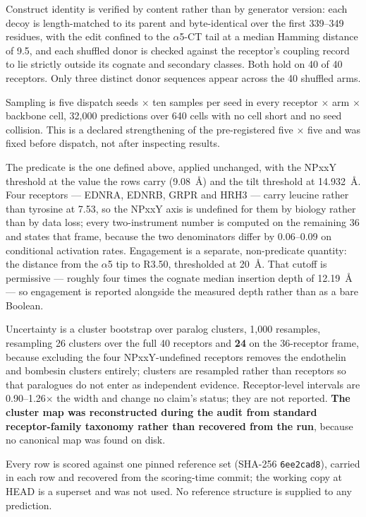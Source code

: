 Construct identity is verified by content rather than by generator version:
each decoy is length-matched to its parent and byte-identical over the first
339--349 residues, with the edit confined to the $\alpha$5-CT tail at a median
Hamming distance of 9.5, and each shuffled donor is checked against the
receptor's coupling record to lie strictly outside its cognate and secondary
classes. Both hold on 40 of 40 receptors. Only three distinct donor sequences
appear across the 40 shuffled arms.

Sampling is five dispatch seeds $\times$ ten samples per seed in every
receptor $\times$ arm $\times$ backbone cell, 32{,}000 predictions over 640
cells with no cell short and no seed collision. This is a declared
strengthening of the pre-registered five $\times$ five and was fixed before
dispatch, not after inspecting results.

The predicate is the one defined above, applied unchanged, with the NPxxY
threshold at the value the rows carry (9.08~\AA{}) and the tilt threshold at
14.932~\AA{}. Four receptors --- EDNRA, EDNRB, GRPR and HRH3 --- carry leucine
rather than tyrosine at 7.53, so the NPxxY axis is undefined for them by
biology rather than by data loss; every two-instrument number is computed on
the remaining 36 and states that frame, because the two denominators differ by
0.06--0.09 on conditional activation rates. Engagement is a separate,
non-predicate quantity: the distance from the $\alpha$5 tip to R3.50, thresholded
at 20~\AA{}. That cutoff is permissive --- roughly four times the cognate median
insertion depth of 12.19~\AA{} --- so engagement is reported alongside the
measured depth rather than as a bare Boolean.

Uncertainty is a cluster bootstrap over paralog clusters, 1{,}000 resamples,
resampling 26 clusters over the full 40 receptors and \textbf{24} on the
36-receptor frame, because excluding the four NPxxY-undefined receptors removes
the endothelin and bombesin clusters entirely;
clusters are resampled rather than receptors so that paralogues do not enter as
independent evidence. Receptor-level intervals are 0.90--1.26$\times$ the width
and change no claim's status; they are not reported. \textbf{The cluster map was
reconstructed during the audit from standard receptor-family taxonomy rather
than recovered from the run}, because no canonical map was found on disk.

Every row is scored against one pinned reference set
(SHA-256 \texttt{6ee2cad8}), carried in each row and recovered from the
scoring-time commit; the working copy at HEAD is a superset and was not used.
No reference structure is supplied to any prediction.

